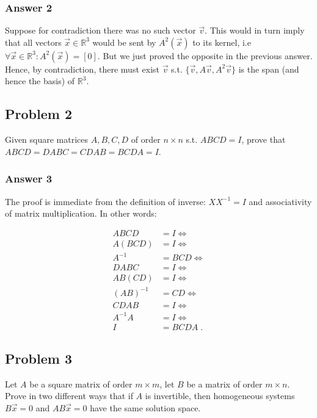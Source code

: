 \documentclass[11pt]{article}
\begin{document}
\subsubsection{Answer 2}
\label{sec:orgheadline2}
Suppose for contradiction there was no such vector \(\vec{v}\).  This would in
turn imply that all vectors \(\vec{x} \in \mathbb{R}^3\) would be sent by
\(A^2(\vec{x})\) to its kernel, i.e \(\forall \vec{x} \in \mathbb{R}^3:
    A^2(\vec{x}) = [0]\).  But we just proved the opposite in the previous
answer.  Hence, by contradiction, there must exist \(\vec{v}\)
s.t. \(\{\vec{v}, A\vec{v}, A^2\vec{v}\}\) is the span (and hence the basis)
of \(\mathbb{R}^3\).

\subsection{Problem 2}
\label{sec:orgheadline5}
Given square matrices \(A, B, C, D\) of order \(n \times n\) s.t. \(ABCD = I\),
prove that \(ABCD = DABC = CDAB = BCDA = I\).

\subsubsection{Answer 3}
\label{sec:orgheadline4}
The proof is immediate from the definition of inverse: \(XX^{-1} = I\) and
associativity of matrix multiplication.  In other words:

\begin{align*}
  ABCD &= I \iff \\
  A(BCD) &= I \iff \\
  A^{-1} &= BCD \iff \\
  DABC &= I \iff \\
  AB(CD) &= I \iff \\
  (AB)^{-1} &= CD \iff \\
  CDAB &= I \iff \\
  A^{-1}A &= I \iff \\
  I &= BCDA \;.
\end{align*}

\subsection{Problem 3}
\label{sec:orgheadline7}
Let \(A\) be a square matrix of order \(m \times m\), let \(B\) be a matrix of
order \(m \times n\).  Prove in two different ways that if \(A\) is invertible,
then homogeneous systems \(B\vec{x} = 0\) and \(AB\vec{x} = 0\) have the same
solution space.
\end{document}
